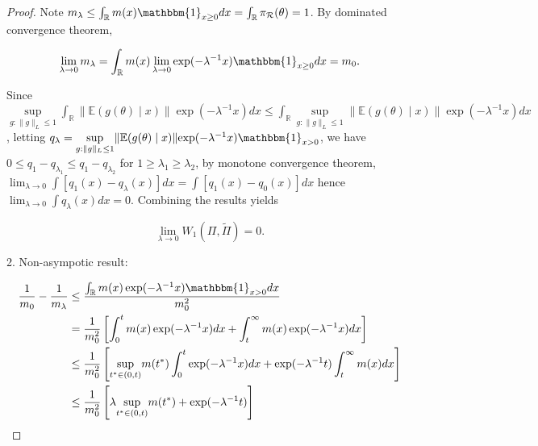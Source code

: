 \documentclass[10pt]{article}
\newcommand{\mc}[1]{\mathcal{#1}}
\DeclareMathOperator{\1}{\mathbbm{1}}
\begin{document}
\begin{proof}[Proof]
	 	  
	Note $m_\lambda\le \int_\mathbb{R} m(x) \mathbbm{1}_{x \ge 0}  dx =\int_\mathbb{R} \pi_{\mc R}(\theta) =1$. By dominated convergence theorem, 

\begin{equation}
	\lim_{\lambda\rightarrow 0}m_\lambda= \int_\mathbb{R}  m(x) \lim_{\lambda\rightarrow 0}\exp(- \lambda^{-1} x ) \mathbbm{1}_{x \ge 0}  d x = m_0.
\end{equation}

	
	   Since 
	  $ \underset{g:\|g\|_L\le 1}\sup \int_\mathbb{R}  \|\mathbb{E}(g(\theta) \mid x)\| { \exp(- \lambda^{-1} x)} dx \le \int_\mathbb{R} \underset{g:\|g\|_L\le 1}\sup \|\mathbb{E}(g(\theta) \mid x)\| { \exp(- \lambda^{-1} x)} dx$,
	  letting $q_\lambda=	  \underset{g:\|g\|_L\le 1}\sup \|\mathbb{E}(g(\theta) \mid x)\| { \exp(- \lambda^{-1} x)}
	\mathbbm{1}_{x > 0}  $, we have $0\le q_1-q_{\lambda_1}\le q_1-q_{\lambda_2}$ for $1\ge\lambda_1\ge \lambda_2$, by monotone convergence theorem, $\lim_{\lambda\rightarrow 0}\int [ q_1(x)-q_\lambda(x)]dx = \int [q_1(x)- q_0(x) ]dx$ hence $\lim_{\lambda\rightarrow 0}\int q_\lambda(x)dx =0$. Combining the results yields 
	  
	  
	
	\begin{equation}
 \underset{\lambda \rightarrow 0}\lim W_1(\Pi,\tilde\Pi)=0.	  \end{equation}
	  
	  2. Non-asympotic result:
	

	\begin{equation}
	\label{wass1}
	\begin{aligned}
	\frac{1}{m_0}-\frac{1}{m_\lambda} & \le  \frac{   \int_\mathbb{R}  m(x) \exp(- \lambda^{-1} x ) \mathbbm{1}_{x > 0}  d x } {  m_0^2}  \\
	&= \frac{1}{ m_0^2} \left[ \int_0^{t}  m(x) \exp(- \lambda^{-1} x ) dx + \int_t^{\infty}  m(x) \exp(- \lambda^{-1} x ) dx \right] \\
	&\le \frac{1}{ m_0^2} \left[  \underset{t^*\in (0,t)}\sup m(t^{*})\int_0^{t} \exp(- \lambda^{-1} x ) dx + \exp(- \lambda^{-1} t )\int_t^{\infty}  m(x) dx  \right] \\
	&\le \frac{1}{ m_0^2} \left[\lambda \underset{t^*\in (0,t)}\sup  m(t^{*})  + \exp(- \lambda^{-1} t ) \right] 
	\end{aligned}
\end{equation}


\end{proof}
\end{document}

